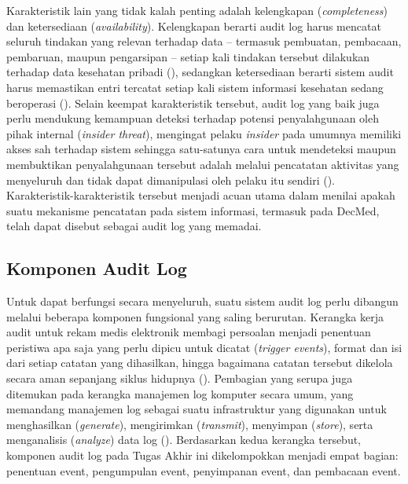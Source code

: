 Karakteristik lain yang tidak kalah penting adalah kelengkapan
(\textit{completeness}) dan ketersediaan (\textit{availability}).
Kelengkapan berarti audit log harus mencatat seluruh tindakan yang
relevan terhadap data -- termasuk pembuatan, pembacaan, pembaruan,
maupun pengarsipan -- setiap kali tindakan tersebut dilakukan terhadap
data kesehatan pribadi (\cite{iso27789_2021}), sedangkan ketersediaan
berarti sistem audit harus memastikan entri tercatat setiap kali
sistem informasi kesehatan sedang beroperasi (\cite{iso27789_2021}).
Selain keempat karakteristik tersebut, audit log yang baik juga perlu
mendukung kemampuan deteksi terhadap potensi penyalahgunaan oleh pihak
internal (\textit{insider threat}), mengingat pelaku \textit{insider}
pada umumnya memiliki akses sah terhadap sistem sehingga satu-satunya
cara untuk mendeteksi maupun membuktikan penyalahgunaan tersebut adalah
melalui pencatatan aktivitas yang menyeluruh dan tidak dapat
dimanipulasi oleh pelaku itu sendiri (\cite{cert2022insiderthreat}).
Karakteristik-karakteristik tersebut menjadi acuan utama dalam menilai
apakah suatu mekanisme pencatatan pada sistem informasi, termasuk pada
DecMed, telah dapat disebut sebagai audit log yang memadai.

\subsection{Komponen Audit Log}
\label{subsec:komponen-audit-log}

Untuk dapat berfungsi secara menyeluruh, suatu sistem audit log perlu
dibangun melalui beberapa komponen fungsional yang saling berurutan.
Kerangka kerja audit untuk rekam medis elektronik membagi persoalan
menjadi penentuan peristiwa apa saja yang perlu dipicu untuk dicatat
(\textit{trigger events}), format dan isi dari setiap catatan yang
dihasilkan, hingga bagaimana catatan tersebut dikelola secara aman
sepanjang siklus hidupnya (\cite{iso27789_2021}). Pembagian yang
serupa juga ditemukan pada kerangka manajemen log komputer secara
umum, yang memandang manajemen log sebagai suatu infrastruktur yang
digunakan untuk menghasilkan (\textit{generate}), mengirimkan
(\textit{transmit}), menyimpan (\textit{store}), serta menganalisis
(\textit{analyze}) data log (\cite{nist80092}). Berdasarkan kedua
kerangka tersebut, komponen audit log pada Tugas Akhir ini
dikelompokkan menjadi empat bagian: penentuan event, pengumpulan
event, penyimpanan event, dan pembacaan event.

